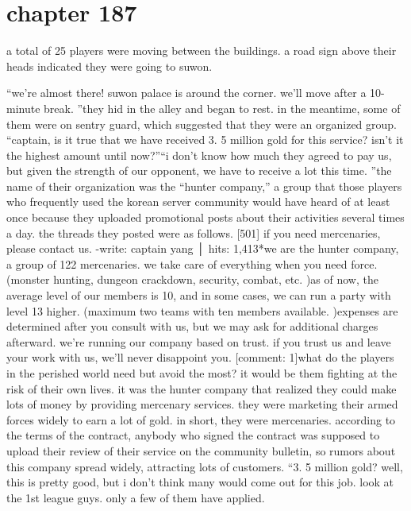 \section{chapter 187}

                            a total of 25 players were moving between the buildings.
 a road sign above their heads indicated they were going to suwon.





“we’re almost there! suwon palace is around the corner.
 we’ll move after a 10-minute break.
”they hid in the alley and began to rest.
 in the meantime, some of them were on sentry guard, which suggested that they were an organized group.
“captain, is it true that we have received 3.
5 million gold for this service? isn’t it the highest amount until now?”“i don’t know how much they agreed to pay us, but given the strength of our opponent, we have to receive a lot this time.
”the name of their organization was the “hunter company,” a group that those players who frequently used the korean server community would have heard of at least once because they uploaded promotional posts about their activities several times a day.
the threads they posted were as follows.
[501] if you need mercenaries, please contact us.
-write: captain yang │ hits: 1,413*we are the hunter company, a group of 122 mercenaries.
 we take care of everything when you need force.
 (monster hunting, dungeon crackdown, security, combat, etc.
)as of now, the average level of our members is 10, and in some cases, we can run a party with level 13 higher.
 (maximum two teams with ten members available.
)expenses are determined after you consult with us, but we may ask for additional charges afterward.
 we’re running our company based on trust.
 if you trust us and leave your work with us, we’ll never disappoint you.
[comment: 1]what do the players in the perished world need but avoid the most? it would be them fighting at the risk of their own lives.
 it was the hunter company that realized they could make lots of money by providing mercenary services.
 they were marketing their armed forces widely to earn a lot of gold.
 in short, they were mercenaries.
according to the terms of the contract, anybody who signed the contract was supposed to upload their review of their service on the community bulletin, so rumors about this company spread widely, attracting lots of customers.
“3.
5 million gold? well, this is pretty good, but i don’t think many would come out for this job.
 look at the 1st league guys.
 only a few of them have applied.
